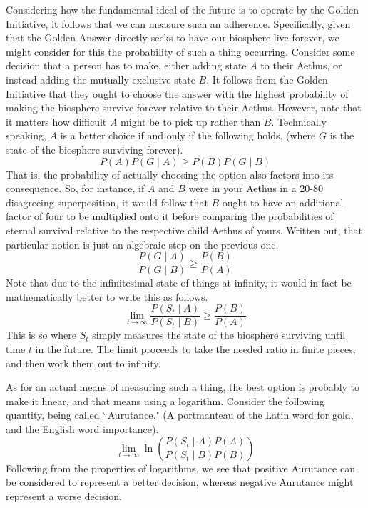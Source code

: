 Considering how the fundamental ideal of the future is to operate by the Golden Initiative, it follows that we can measure such an adherence. Specifically, given that the Golden Answer directly seeks to have our biosphere live forever, we might consider for this the probability of such a thing occurring. Consider some decision that a person has to make, either adding state $A$ to their Aethus, or instead adding the mutually exclusive state $B$. It follows from the Golden Initiative that they ought to choose the answer with the highest probability of making the biosphere survive forever relative to their Aethus. However, note that it matters how difficult $A$ might be to pick up rather than $B$. Technically speaking, $A$ is a better choice if and only if the following holds, (where $G$ is the state of the biosphere surviving forever). 
\begin{equation}
    P \! \left( A \right) P \! \left( G \mid A \right) \geq P \! \left( B \right) P \! \left( G \mid B \right)
\end{equation}
That is, the probability of actually choosing the option also factors into its consequence. So, for instance, if $A$ and $B$ were in your Aethus in a 20-80 disagreeing superposition, it would follow that $B$ ought to have an additional factor of four to be multiplied onto it before comparing the probabilities of eternal survival relative to the respective child Aethus of yours. Written out, that particular notion is just an algebraic step on the previous one. 
\begin{equation}
    \frac{P \! \left( G \mid A \right)}{P \! \left( G \mid B \right)} \geq \frac{P \! \left( B \right)}{P \! \left( A \right)}
\end{equation}
Note that due to the infinitesimal state of things at infinity, it would in fact be mathematically better to write this as follows.
\begin{equation}
    \lim_{t \to \infty} \frac{P \! \left( S_t \mid A \right)}{P \! \left( S_t \mid B \right)} \geq \frac{P \! \left( B \right)}{P \! \left( A \right)}
\end{equation}
This is so where $S_t$ simply measures the state of the biosphere surviving until time $t$ in the future. The limit proceeds to take the needed ratio in finite pieces, and then work them out to infinity. 

As for an actual means of measuring such a thing, the best option is probably to make it linear, and that means using a logarithm. Consider the following quantity, being called ``Aurutance." (A portmanteau of the Latin word for gold, and the English word importance).
\begin{equation}
    \lim_{t \to \infty} \ln \! \left( \frac{P \! \left( S_t \mid A \right) P \! \left( A \right)}{P \! \left( S_t \mid B \right) P \! \left( B \right)} \right)
\end{equation}
Following from the properties of logarithms, we see that positive Aurutance can be considered to represent a better decision, whereas negative Aurutance might represent a worse decision. 

